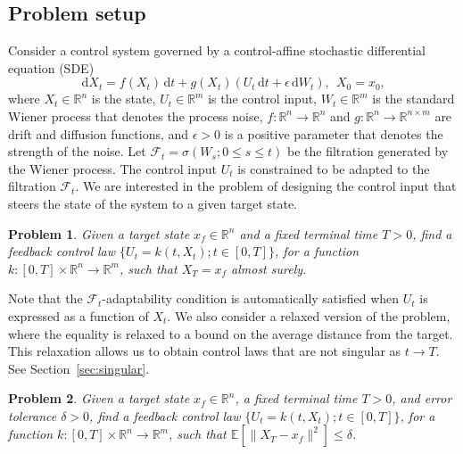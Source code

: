 \documentclass[letterpaper, 10 pt, conference]{ieeeconf}  %
\def\Re{\mathbb{R}}
\def\R{\mathbb{R}}
\newcommand{\field}[1]{\mathbb{#1}}
\def\Re{\field{R}}
\def\R{\mathbb{R}}
\newtheorem{remark}{Remark}
\newtheorem{problem}{Problem}
\newcommand{\ud}{\,\mathrm{d}}
\def\Re{\mathbb{R}}
\renewcommand{\Re}{\mathbb{R}}
\begin{document}
\subsection{Problem setup}
Consider a  control system governed by a control-affine stochastic differential equation (SDE)
\begin{equation}\label{eq:sde}
    \ud X_t = f(X_t)\ud t + g(X_t) (U_t \ud t + \epsilon \ud W_t), ~~X_0 = x_0,
\end{equation}
where $X_t \in \mathbb{R}^n$ is the state, $U_t \in \R^m$ is the control input, $W_t \in \R^m$ is the standard Wiener process that denotes the process noise, $f:\R^n\to\R^n$ and $g:\Re^n \to \Re^{n\times m}$ are drift and diffusion functions, and $\epsilon >0$ is a positive parameter that denotes the strength of the noise. Let $\mathcal{F}_t = \sigma(W_s; 0\leq s \leq t)$ be the filtration generated by the Wiener process. The control input $U_t$ is constrained to be adapted to the filtration $\mathcal{F}_t$. We are interested in the problem of designing the control input that steers the state of the system to a given target state. 


\begin{problem}\label{prob:steer-to-y}
    Given a target state $x_f \in  \R^n$ and a fixed terminal time $T>0$, find a feedback control law $\{U_t=k(t,X_t);t\in[0,T]\}$, for a function $k: [0,T] \times \R^n \rightarrow \R^m$, such that  $X_T = x_f$ almost surely.
\end{problem}

Note that the $\mathcal{F}_t$-adaptability condition is automatically satisfied when $U_t$ is expressed as a function of $X_t$.  We also consider a relaxed version of the problem, where the  equality is relaxed to a bound on the average distance from the target. This relaxation allows us to obtain control laws that are not singular as $t\to T$. See Section~\ref{sec:singular}.

\begin{problem}\label{prob:approx-steer-to-y}
    Given a target state $x_f \in  \R^n$, a fixed terminal time $T>0$, and error tolerance $\delta>0$, find a feedback control law $\{U_t=k(t,X_t);t\in[0,T]\}$, for a function $k: [0,T] \times \R^n \rightarrow \R^m$, such that  $\mathbb E[\|X_T - x_f\|^2]\leq \delta$.
\end{problem} 
\end{document}
